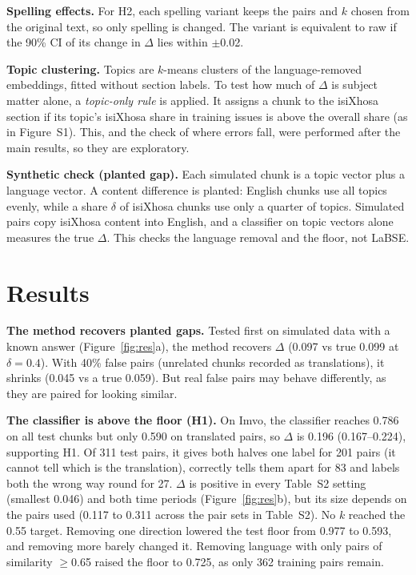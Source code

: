 \documentclass[10pt,letterpaper]{article}
\begin{document}
\textbf{Spelling effects.} For H2, each spelling variant keeps the pairs and $k$ chosen from the original
text, so only spelling is changed. The variant is equivalent to raw if the 90\% CI of its change in $\Delta$ lies within $\pm$0.02.

\textbf{Topic clustering.} Topics are $k$-means clusters of the language-removed embeddings, fitted without section labels. To
test how much of $\Delta$ is subject matter alone, a \emph{topic-only rule} is applied. It assigns a chunk to the isiXhosa
section if its topic's isiXhosa share in training issues is above the overall share (as in Figure~S1).
This, and the check of where errors fall, were performed after the main results, so they are
exploratory.

\textbf{Synthetic check (planted gap).} Each simulated chunk is a topic vector plus a
language vector. A content difference is planted: English chunks use all topics evenly,
while a share $\delta$ of isiXhosa chunks use only a quarter of topics. Simulated pairs copy isiXhosa content into English, and a classifier on topic vectors alone measures the true $\Delta$. This checks the language removal and the floor, not LaBSE.


\section{Results}
\textbf{The method recovers planted gaps.} Tested first on simulated data with a known answer
(Figure~\ref{fig:res}a), the method recovers $\Delta$ (0.097 vs true 0.099 at $\delta{=}0.4$). With 40\% false
pairs (unrelated chunks recorded as translations), it shrinks (0.045 vs a true 0.059). But real false pairs may
behave differently, as they are paired for looking similar.

\textbf{The classifier is above the floor (H1).} On Imvo, the classifier reaches 0.786 on all test chunks but only 0.590 on translated pairs, so $\Delta$ is 0.196 (0.167--0.224), supporting H1. Of 311 test pairs, it gives both halves one label for 201 pairs (it cannot tell which is the translation), correctly tells them apart for 83 and labels both the wrong way round for 27. $\Delta$ is positive in every Table~S2 setting (smallest 0.046) and both time periods (Figure~\ref{fig:res}b), but its size depends on the pairs used (0.117 to 0.311 across the pair sets in Table~S2). No $k$ reached the 0.55 target. Removing one direction lowered the test floor from 0.977 to 0.593, and removing more barely changed it. Removing language with only pairs of similarity $\geq$0.65 raised the floor to 0.725, as only 362 training pairs remain.
\end{document}
